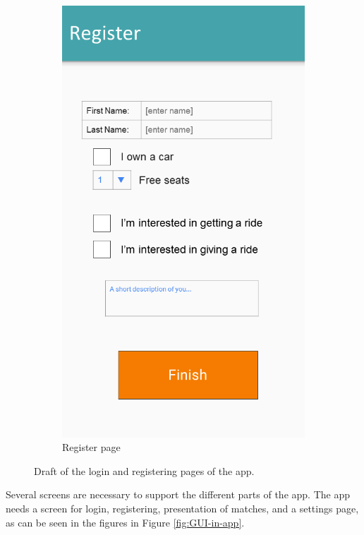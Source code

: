 \begin{figure}[h!]
\begin{subfigure}[b]{0.3\textwidth}
	 	\includegraphics[width=\textwidth]{figures/GUI-register.png}
	 	\caption{Register page}
	 	\label{fig:GUI-register}
	 \end{subfigure}
	 \caption{Draft of the login and registering pages of the app.}\label{fig:GUI-firstrun}
\end{figure}

Several screens are necessary to support the different parts of the app. 
The app needs a screen for login, registering, presentation of matches, and a settings page, as can be seen in the figures in Figure \ref{fig:GUI-in-app}.

